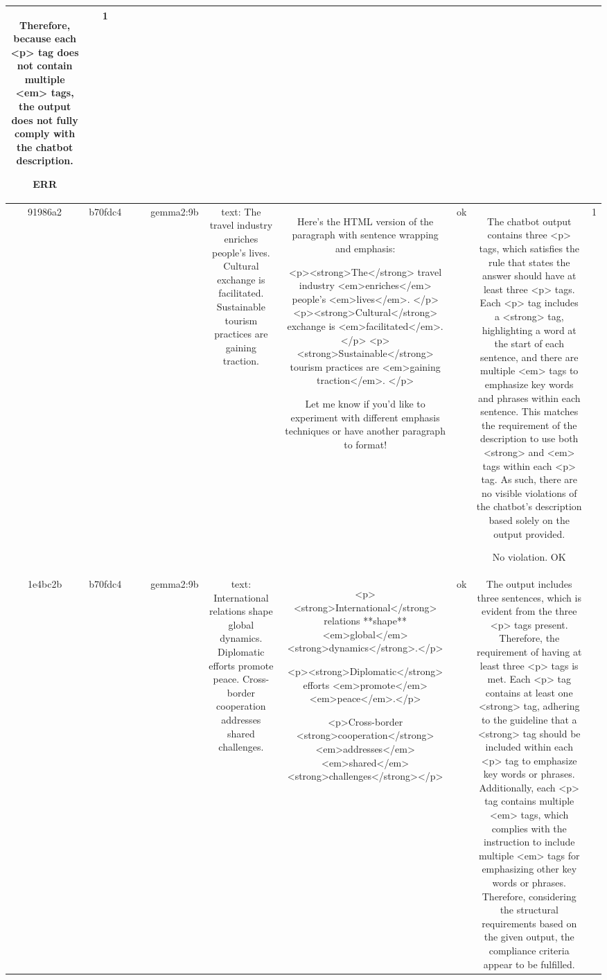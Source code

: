 \begin{table}[h!]
\begin{tabular}{|c|c|c|c|c|c|c|c|c|c|}
Therefore, because each <p> tag does not contain multiple <em> tags, the output does not fully comply with the chatbot description.

ERR & 1\\
\hline
91986a2 & b70fdc4 &  &  & gemma2:9b & text: The travel industry enriches people's lives. Cultural exchange is facilitated. Sustainable tourism practices are gaining traction. & Here's the HTML version of the paragraph with sentence wrapping and emphasis:

<p><strong>The</strong> travel industry <em>enriches</em> people's <em>lives</em>. </p>
<p><strong>Cultural</strong> exchange is <em>facilitated</em>. </p>
<p><strong>Sustainable</strong> tourism practices are <em>gaining traction</em>. </p> 


Let me know if you'd like to experiment with different emphasis techniques or have another paragraph to format!  
 & ok & The chatbot output contains three <p> tags, which satisfies the rule that states the answer should have at least three <p> tags. Each <p> tag includes a <strong> tag, highlighting a word at the start of each sentence, and there are multiple <em> tags to emphasize key words and phrases within each sentence. This matches the requirement of the description to use both <strong> and <em> tags within each <p> tag. As such, there are no visible violations of the chatbot's description based solely on the output provided.

No violation.
OK & 1\\
\hline
1e4bc2b & b70fdc4 &  &  & gemma2:9b & text: International relations shape global dynamics. Diplomatic efforts promote peace. Cross-border cooperation addresses shared challenges. & <p><strong>International</strong> relations **shape** <em>global</em> <strong>dynamics</strong>.</p>

<p><strong>Diplomatic</strong> efforts <em>promote</em> <em>peace</em>.</p>

<p>Cross-border <strong>cooperation</strong> <em>addresses</em> <em>shared</em> <strong>challenges</strong></p>  
 & ok & The output includes three sentences, which is evident from the three <p> tags present. Therefore, the requirement of having at least three <p> tags is met. Each <p> tag contains at least one <strong> tag, adhering to the guideline that a <strong> tag should be included within each <p> tag to emphasize key words or phrases. Additionally, each <p> tag contains multiple <em> tags, which complies with the instruction to include multiple <em> tags for emphasizing other key words or phrases. Therefore, considering the structural requirements based on the given output, the compliance criteria appear to be fulfilled.


\end{tabular}
\end{table}
